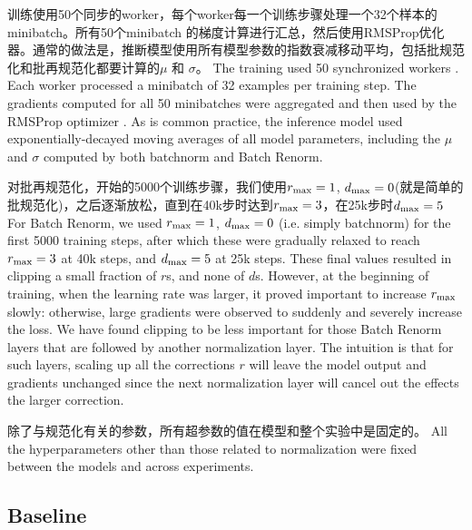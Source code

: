 训练使用50个同步的worker，每个worker每一个训练步骤处理一个32个样本的minibatch。所有50个minibatch 的梯度计算进行汇总，然后使用RMSProp优化器。通常的做法是，推断模型使用所有模型参数的指数衰减移动平均，包括批规范化和批再规范化都要计算的$\mu$ 和 $\sigma$。
The training used 50 synchronized workers \cite{syncreplicas}. Each worker processed a minibatch of 32 examples per training step. The gradients computed for all 50 minibatches were aggregated and then used by the RMSProp optimizer \cite{rmsprop}. As is common practice, the inference model used exponentially-decayed moving averages of all model parameters, including the $\mu$ and $\sigma$ computed by both batchnorm and Batch Renorm.

对批再规范化，开始的5000个训练步骤，我们使用$r_{\text{max}}=1$, $d_{\text{max}}=0$(就是简单的批规范化)，之后逐渐放松，直到在40k步时达到$r_{\text{max}}=3$，在25k步时$d_{\text{max}}=5$ 
For Batch Renorm, we used $r_{\text{max}}=1$, $d_{\text{max}}=0$ (i.e. simply batchnorm) for the first 5000 training steps, after which these were gradually relaxed to reach $r_{\text{max}}=3$ at 40k steps, and $d_{\text{max}}=5$ at 25k steps. These final values resulted in clipping a small fraction of $r$s, and none of $d$s. However, at the beginning of training, when the learning rate was larger, it proved important to increase $r_{\text{max}}$ slowly: otherwise, large gradients were observed to suddenly and severely increase the loss. We have found clipping to be less important for those Batch Renorm layers that are followed by another normalization layer. The intuition is that for such layers, scaling up all the corrections $r$ will leave the model output and gradients unchanged since the next normalization layer will cancel out the effects the larger correction.

除了与规范化有关的参数，所有超参数的值在模型和整个实验中是固定的。
All the hyperparameters other than those related to normalization were fixed between the models and across experiments.

\subsection{Baseline}

